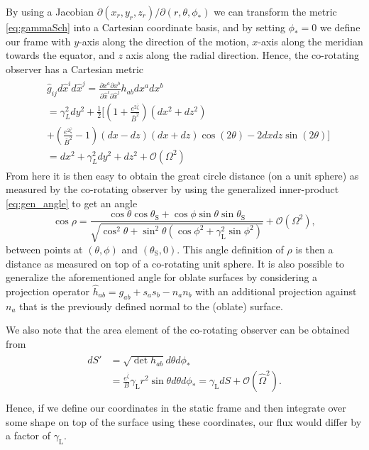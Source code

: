 \documentclass[iop, usenatbib]{emulateapj}
\newcommand{\be}{\begin{equation}}
\newcommand{\ee}{\end{equation}}
\newcommand{\Ob}{\ensuremath{\hat{\Omega}}}
\newcommand{\zetab}{\ensuremath{\bar{\zeta}}}
\newcommand{\Bb}{\ensuremath{\bar{B}}}
\newcommand{\lgamma}{\gamma_{\text{L}}}
\begin{document}
By using a Jacobian $\partial(x_r, y_r, z_r)/\partial (r, \theta, \phi_*)$ we can transform the metric \eqref{eq:gammaSch} into a Cartesian coordinate basis, and by setting $\phi_*=0$ we define our frame with $y$-axis along the direction of the motion, $x$-axis along the meridian towards the equator, and $z$ axis along the radial direction.
Hence, the co-rotating observer has a Cartesian metric
\begin{align}\begin{split}
& \hat{g}_{ij} d\hat{x}^i d\hat{x}^j = \frac{\partial x^a \partial x^b}{\partial \hat{x}^i \partial \hat{x}^j} h_{ab} dx^a dx^b  \\
&= \gamma_L^2 dy^2 + \frac{1}{2} [ (1+ \frac{e^{2\zetab}}{\Bb^2})(dx^2 + dz^2) \\
&+ (\frac{e^{2\zetab}}{\Bb^2} - 1)(dx-dz)(dx + dz) \cos(2\theta) - 2dx dz \sin(2\theta) ] \\
& = dx^2 + \gamma_L^2 dy^2 + dz^2 + \mathcal{O}(\Omega^2)
\end{split}\end{align}
From here it is then easy to obtain the great circle distance (on a unit sphere) as measured by the co-rotating observer by using the generalized inner-product \eqref{eq:gen_angle} to get an angle
\be\label{eq:rel_cos}
\cos\rho = \frac{\cos\theta \cos\theta_\mathrm{S} + \cos\phi \sin\theta \sin\theta_{\mathrm{S}}}{\sqrt{ \cos^2\theta + \sin^2\theta (\cos\phi^2 + \lgamma^2 \sin\phi^2)}} + \mathcal{O}(\Omega^2), 
\ee
between points at $(\theta, \phi)$ and $(\theta_{\mathrm{S}}, 0)$.
This angle definition of $\rho$ is then a distance as measured on top of a co-rotating unit sphere.  
It is also possible to generalize the aforementioned angle for oblate surfaces by considering a projection operator $\hat{h}_{ab} = g_{ab} + s_a s_b - n_a n_b$ with an additional projection against $n_a$ that is the previously defined normal to the (oblate) surface.

We also note that the area element of the co-rotating observer can be obtained from
\begin{align}\begin{split}
dS' &= \sqrt{\det h_{ab}} d\theta d\phi_* \\
&= \frac{e^{\zetab}}{B} \lgamma r^2 \sin\theta d\theta d\phi_* = \lgamma dS + \mathcal{O}(\Ob^2). \\
\end{split}\end{align}
Hence, if we define our coordinates in the static frame and then integrate over some shape on top of the surface using these coordinates, our flux would differ by a factor of $\lgamma$.
\end{document}
